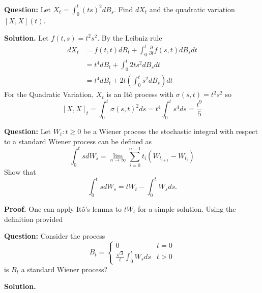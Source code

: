 \documentclass{article}
\begin{document}
\begin{tcolorbox}[colframe=black,colback=gray!5,boxrule=0.5pt]
\textbf{Question:} Let $X_t = \int_0^t (ts)^2dB_s$. Find $dX_t$ and the quadratic variation $[X,X](t)$.
\end{tcolorbox}
\textbf{Solution.} Let $f(t,s) = t^2s^2$. By the Leibniz rule 
\begin{align*}
    dX_t &= f(t,t)dB_t + \int_0^t \frac{\partial}{\partial t}f(s,t) dB_sdt  \\
         &= t^4dB_t + \int_0^t 2ts^2dB_sdt \\
         &= t^4dB_t + 2t \left(\int_0^t s^2dB_s\right)dt
\end{align*}
For the Quadratic Variation, $X_t$ is an Itô process with $\sigma(s,t) = t^2 s^2$ so
$$[X,X]_t = \int_0^t \sigma(s,t)^2 ds = t^4\int_0^t s^4ds = \frac{t^9}{5}$$

\begin{tcolorbox}[colframe=black,colback=gray!5,boxrule=0.5pt]
\textbf{Question:} Let $W_t : t\geq0$ be a Wiener process the stochastic integral with respect to a standard Wiener process can be defined as 
$$\int_0^ts dW_s = \lim_{n\to\infty}\sum_{i=0}^{n-1}t_i(W_{t_{i+1} } - W_{t_i})$$
Show that 
$$\int_0^tsdW_s = tW_t - \int_0^tW_sds.$$
\end{tcolorbox}
\textbf{Proof.} One can apply Itô's lemma to $tW_t$ for a simple solution. Using the definition provided


\begin{tcolorbox}[colframe=black,colback=gray!5,boxrule=0.5pt]
\textbf{Question:} Consider the process 
$$
B_t = \begin{cases}
    0 & t=0 \\
    \frac{\sqrt{3}}{t}\int_0^tW_s ds & t>0
\end{cases}
$$
is $B_t$ a standard Wiener process? 
\end{tcolorbox}
\textbf{Solution.}
\end{document}
